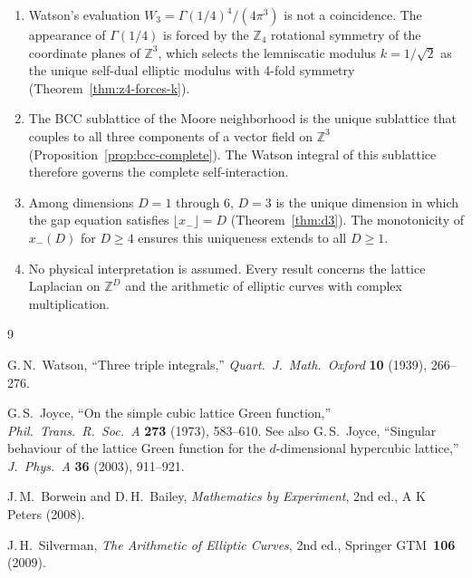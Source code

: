 \documentclass[12pt]{article}
\theoremstyle{definition}
\theoremstyle{remark}
\begin{document}
\begin{enumerate}
    \item Watson's evaluation $W_3 = \Gamma(1/4)^4/(4\pi^3)$ is not a coincidence. The appearance of $\Gamma(1/4)$ is forced by the $\mathbb{Z}_4$ rotational symmetry of the coordinate planes of $\mathbb{Z}^3$, which selects the lemniscatic modulus $k = 1/\sqrt{2}$ as the unique self-dual elliptic modulus with 4-fold symmetry (Theorem~\ref{thm:z4-forces-k}).

    \item The BCC sublattice of the Moore neighborhood is the unique sublattice that couples to all three components of a vector field on $\mathbb{Z}^3$ (Proposition~\ref{prop:bcc-complete}). The Watson integral of this sublattice therefore governs the complete self-interaction.

    \item Among dimensions $D = 1$ through $6$, $D = 3$ is the unique dimension in which the gap equation satisfies $\lfloor x_- \rfloor = D$ (Theorem~\ref{thm:d3}). The monotonicity of $x_-(D)$ for $D \geq 4$ ensures this uniqueness extends to all $D \geq 1$.

    \item No physical interpretation is assumed. Every result concerns the lattice Laplacian on $\mathbb{Z}^D$ and the arithmetic of elliptic curves with complex multiplication.
\end{enumerate}

\begin{thebibliography}{9}

G.\,N.\ Watson, ``Three triple integrals,'' \textit{Quart.\ J.\ Math.\ Oxford} \textbf{10} (1939), 266--276.

G.\,S.\ Joyce, ``On the simple cubic lattice Green function,'' \textit{Phil.\ Trans.\ R.\ Soc.\ A} \textbf{273} (1973), 583--610. See also G.\,S.\ Joyce, ``Singular behaviour of the lattice Green function for the $d$-dimensional hypercubic lattice,'' \textit{J.\ Phys.\ A} \textbf{36} (2003), 911--921.

J.\,M.\ Borwein and D.\,H.\ Bailey, \textit{Mathematics by Experiment}, 2nd ed., A K Peters (2008).

J.\,H.\ Silverman, \textit{The Arithmetic of Elliptic Curves}, 2nd ed., Springer GTM~\textbf{106} (2009).

\end{thebibliography}
\end{document}
